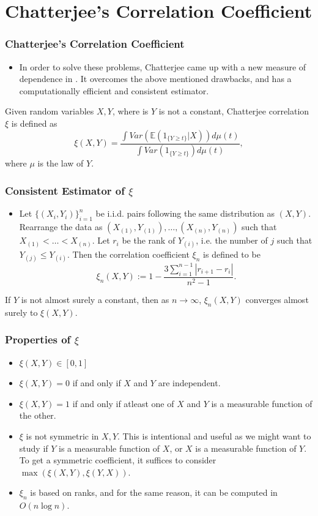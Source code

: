 \documentclass [xcolor=svgnames, t] {beamer}
\begin{document}
\section{Chatterjee's Correlation Coefficient}
\begin{frame}
    \frametitle{Chatterjee's Correlation Coefficient}
    \begin{itemize}
        \item In order to solve these problems, Chatterjee came up with a new measure of dependence in \cite{chatterjee2020sourav}.
        It overcomes the above mentioned drawbacks, and has a computationally efficient and consistent estimator.
    \end{itemize}
    \vspace{2em}
    \begin{definition}
        Given random variables $X, Y$, where is $Y$ is not a constant, Chatterjee correlation $\xi$ is defined as
        $$\xi(X, Y) = \frac{\int Var(\mathbb{E}(1_{\{Y \geq t\}}|X)) d\mu(t)}{\int Var(1_{\{Y \geq t\}}) d\mu(t)},$$
        where $\mu$ is the law of $Y$.
    \end{definition}
\end{frame}

\begin{frame}
    \frametitle{Consistent Estimator of $\xi$}
    \begin{itemize}
        \item Let $\{(X_i, Y_i)\}_{i = 1}^n$ be i.i.d. pairs following the same distribution as $(X, Y)$.
        Rearrange the data as $(X_{(1)}, Y_{(1)}), \dots, (X_{(n)}, Y_{(n)})$ such that $X_{(1)} < \dots < X_{(n)}$. Let $r_i$ be the rank of $Y_{(i)}$, i.e. the number of $j$ such that $Y_{(j)} \leq Y_{(i)}$.  Then the correlation coefficient $\xi_n$ is defined to be
		$$\xi_n(X, Y) := 1-\frac{3\sum_{i=1}^{n-1} |r_{i+1} - r_i|}{n^2-1}.$$
    \end{itemize}
    \begin{theorem}
        If $Y$ is not almost surely a constant, then as $n \rightarrow \infty$, $\xi_n(X, Y)$ converges almost surely to $\xi(X, Y)$.
    \end{theorem}
\end{frame}

\begin{frame}
    \frametitle{Properties of $\xi$}
    \begin{itemize}
        \item $\xi(X, Y) \in [0, 1]$
		\item $\xi(X, Y) = 0$ if and only if $X$ and $Y$ are independent.
		\item $\xi(X, Y) = 1$ if and only if atleast one of $X$ and $Y$ is a measurable function of the other.
		\item $\xi$ is not symmetric in $X, Y$. This is intentional and useful as we might want to study if $Y$ is a measurable function of $X$, or $X$ is a measurable function of $Y$. To get a symmetric coefficient, it suffices to consider $\max(\xi(X, Y), \xi(Y, X))$.
		\item $\xi_n$ is based on ranks, and for the same reason, it can be computed in $O(n\log n)$.
    \end{itemize}
\end{frame}
\end{document}
